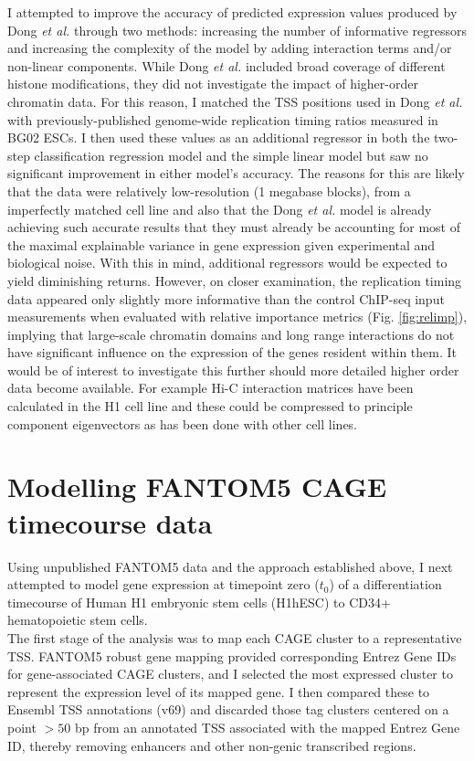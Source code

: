 \documentclass[a4paper,10pt,oneside]{book}
\begin{document}
I attempted to improve the accuracy of predicted expression values
produced by Dong \emph{et al.} through two methods: increasing the number of informative
regressors and increasing the complexity of the model by adding
interaction terms and/or non-linear components. While Dong \emph{et
  al.} included broad coverage of different histone modifications,
they did not investigate the impact of higher-order
chromatin data. For this reason, I matched the TSS positions used in
Dong \emph{et al.} with previously-published genome-wide replication
timing ratios measured in BG02 ESCs.\cite{Ryba2010} I then used these values as an additional
regressor in both the two-step classification regression model and the
simple linear model but saw no significant improvement in either
model's accuracy. The reasons for this are likely that the 
data were relatively low-resolution (1 megabase blocks), from a
imperfectly matched cell line and also that
the Dong \emph{et al.} model is already achieving such accurate
results that they must already be accounting for most of the maximal
explainable variance in gene expression given experimental and
biological noise. With this in mind, additional regressors would be
expected to yield diminishing returns. However, on closer examination,
the replication timing data
appeared only slightly more informative than the control ChIP-seq input
measurements when evaluated with relative importance metrics
(Fig. \ref{fig:relimp}), implying that large-scale chromatin domains
and long range interactions
do not have significant influence on the expression of the genes resident within them. It would
be of interest to investigate this further should more detailed higher order
data become available. For example Hi-C interaction matrices have been
calculated in the H1 cell line\cite{Dixon2012} and these could be
compressed to principle component eigenvectors as has been done with
other cell lines.\cite{Lieberman2011}

\section{Modelling FANTOM5 CAGE timecourse data}
Using unpublished FANTOM5 data and the approach established above, I next attempted to model gene
expression at timepoint zero ($t_0$) of a differentiation timecourse of Human
H1 embryonic stem cells (H1hESC) to CD34+ hematopoietic stem
cells. \\

The first stage of the analysis was to map each CAGE cluster to a
representative TSS. FANTOM5 robust gene mapping\cite{fantom5}
provided corresponding Entrez Gene IDs for gene-associated CAGE
clusters, and I selected the most expressed cluster to represent the
expression level of its mapped gene. I then compared these to Ensembl
TSS annotations (v69) and
discarded those tag clusters centered on a point $>50$ bp from an annotated
TSS associated with the mapped Entrez Gene ID, thereby removing enhancers and other non-genic transcribed
regions. \\
\end{document}
